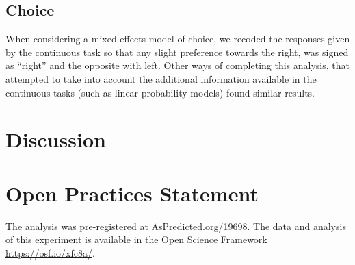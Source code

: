 \documentclass[12pt]{article}
\begin{document}
\subsection{Choice}

When considering a mixed effects model of choice, we recoded the responses given by the continuous task so that any slight preference towards the right, was signed as ``right'' and the opposite with left. Other ways of completing this analysis, that attempted to take into account the additional information available in the continuous tasks (such as linear probability models) found similar results. 





\section{Discussion}

\section{Open Practices Statement}
The analysis was pre-registered at \url{AsPredicted.org/19698}. The data and analysis of this experiment is available in the Open Science Framework \url{https://osf.io/xfc8a/}. 

\newpage


\end{document}
